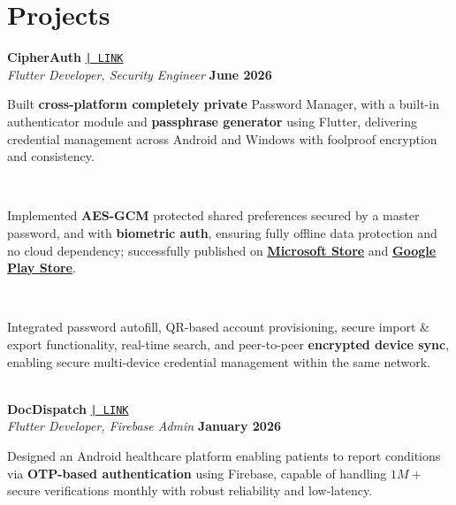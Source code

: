 \documentclass[a4paper,10pt]{article}
\begin{document}
\section{Projects}

\noindent
\textbf{CipherAuth}
\href{https://github.com/ppriyanshu26/CipherAuth-Flutter}{\texttt{| LINK}} \\
\textit{Flutter Developer, Security Engineer} \hfill \textbf{June 2026} \\[-8pt]

\noindent\makebox[1.5em][l]{--}%
\parbox[t]{\dimexpr\linewidth-1.5em\relax}{%
Built \textbf{cross-platform completely private} Password Manager, with a built-in authenticator module and \textbf{passphrase generator} using Flutter, delivering credential management across Android and Windows with foolproof encryption and consistency.} \\[0pt]

\noindent\makebox[1.5em][l]{--}%
\parbox[t]{\dimexpr\linewidth-1.5em\relax}{%
Implemented \textbf{AES-GCM} protected shared preferences secured by a master password, and with \textbf{biometric auth}, ensuring fully offline data protection and no cloud dependency; successfully published on \href{https://apps.microsoft.com/detail/9NS2R9NTRF2Z}{\textbf{Microsoft Store}} and \href{https://play.google.com/store/apps/details?id=in.ppriyanshu.cipherauth}{\textbf{Google Play Store}}.} \\[0pt]


\noindent\makebox[1.5em][l]{--}%
\parbox[t]{\dimexpr\linewidth-1.5em\relax}{%
Integrated password autofill, QR-based account provisioning, secure import \& export functionality, real-time search, and peer-to-peer \textbf{encrypted device sync}, enabling secure multi-device credential management within the same network.} \\[4pt]


\noindent
\textbf{DocDispatch}
\href{https://github.com/ppriyanshu26/DocDispatch}{\texttt{| LINK}} \\
\textit{Flutter Developer, Firebase Admin} \hfill \textbf{January 2026} \\[-8pt]

\noindent\makebox[1.5em][l]{--}%
\parbox[t]{\dimexpr\linewidth-1.5em\relax}{%
Designed an Android healthcare platform enabling patients to report conditions via \textbf{OTP-based authentication} using Firebase, capable of handling $1M+$ secure verifications monthly with robust reliability and low-latency.} \\[0pt]
\end{document}
